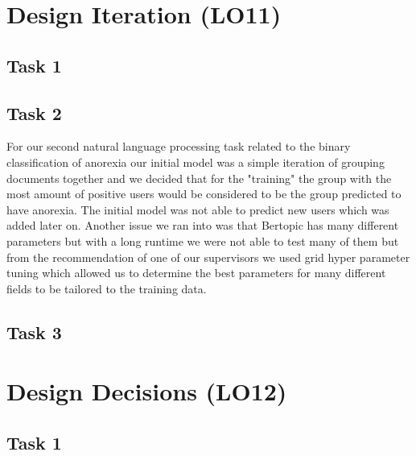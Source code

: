 \documentclass{article}
\begin{document}
\section{Design Iteration (LO11)}


\subsection{Task 1}

\subsection{Task 2}

For our second natural language processing task related to the binary classification of anorexia our initial model was a simple iteration of grouping documents together and we decided that for the "training" the group with the most amount of positive users would be considered to be the group predicted to have anorexia. The initial model was not able to predict new users which was added later on. Another issue we ran into was that Bertopic has many different parameters but with a long runtime we were not able to test many of them but from the recommendation of one of our supervisors we used grid hyper parameter tuning which allowed us to determine the best parameters for many different fields to be tailored to the training data.

\subsection{Task 3}

\section{Design Decisions (LO12)}


\subsection{Task 1}
\end{document}
